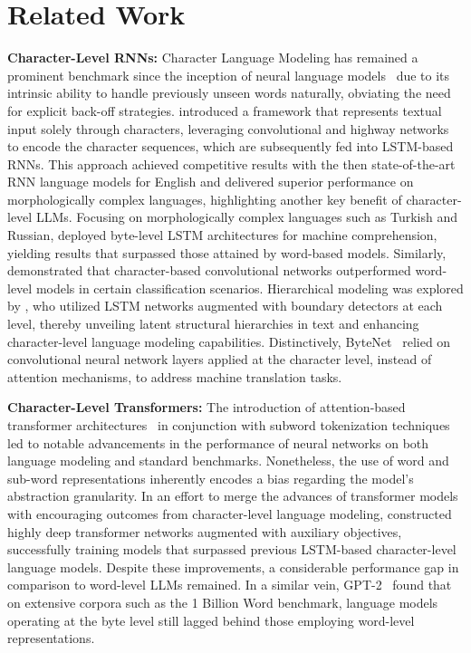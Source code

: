 \section{Related Work}
\label{section:related_work}

\textbf{Character-Level RNNs:} Character Language Modeling has remained a prominent benchmark since the inception of neural language models~\citep{sutskever2011generating,mikolov2012subword,graves2013generating} due to its intrinsic ability to handle previously unseen words naturally, obviating the need for explicit back-off strategies. \cite{kim2016character} introduced a framework that represents textual input solely through characters, leveraging convolutional and highway networks to encode the character sequences, which are subsequently fed into LSTM-based RNNs. This approach achieved competitive results with the then state-of-the-art RNN language models for English and delivered superior performance on morphologically complex languages, highlighting another key benefit of character-level LLMs. Focusing on morphologically complex languages such as Turkish and Russian, \cite{kenter2018byte} deployed byte-level LSTM architectures for machine comprehension, yielding results that surpassed those attained by word-based models. Similarly, \cite{zhang2015character} demonstrated that character-based convolutional networks outperformed word-level models in certain classification scenarios. Hierarchical modeling was explored by \citet{chung2019hierarchical}, who utilized LSTM networks augmented with boundary detectors at each level, thereby unveiling latent structural hierarchies in text and enhancing character-level language modeling capabilities. Distinctively, ByteNet~\cite{kalchbrenner2016neural} relied on convolutional neural network layers applied at the character level, instead of attention mechanisms, to address machine translation tasks.

\textbf{Character-Level Transformers:} The introduction of attention-based transformer architectures~\citep{vaswani2017attention} in conjunction with subword tokenization techniques~\citep{sennrich-etal-2016-neural} led to notable advancements in the performance of neural networks on both language modeling and standard benchmarks. Nonetheless, the use of word and sub-word representations inherently encodes a bias regarding the model’s abstraction granularity. In an effort to merge the advances of transformer models with encouraging outcomes from character-level language modeling, \citet{al2019character} constructed highly deep transformer networks augmented with auxiliary objectives, successfully training models that surpassed previous LSTM-based character-level language models. Despite these improvements, a considerable performance gap in comparison to word-level LLMs remained. In a similar vein, GPT-2~\citep{radfordgpt2} found that on extensive corpora such as the 1 Billion Word benchmark, language models operating at the byte level still lagged behind those employing word-level representations.

